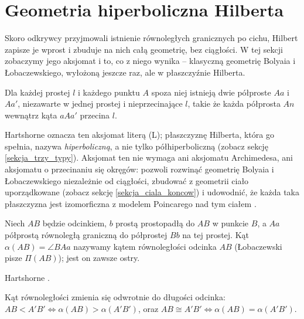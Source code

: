 \section{Geometria hiperboliczna Hilberta} %
\label{sekcja_hilbert_hiperboliczna}

Skoro odkrywcy przyjmowali istnienie równoległych granicznych po cichu, Hilbert zapisze je wprost i zbuduje na nich całą geometrię, bez ciągłości. %
W tej sekcji zobaczymy jego aksjomat i to, co z niego wynika -- klasyczną geometrię Bolyaia i Łobaczewskiego, wyłożoną jeszcze raz, ale w płaszczyźnie Hilberta. %

\begin{axiom}
	Dla każdej prostej $l$ i każdego punktu $A$ spoza niej istnieją dwie półproste $Aa$ i $Aa'$, niezawarte w jednej prostej i nieprzecinające $l$, takie że każda półprosta $An$ wewnątrz kąta $aAa'$ przecina $l$. %
\end{axiom}

Hartshorne \cite[s. 374]{hartshorne_2000} oznacza ten aksjomat literą (L); płaszczyznę Hilberta, która go spełnia, nazywa \emph{hiperboliczną}, a nie tylko półhiperboliczną (zobacz sekcję \ref{sekcja_trzy_typy}). %
Aksjomat ten nie wymaga ani aksjomatu Archimedesa, ani aksjomatu o przecinaniu się okręgów: pozwoli rozwinąć geometrię Bolyaia i Łobaczewskiego niezależnie od ciągłości, zbudować z geometrii ciało uporządkowane (zobacz sekcję \ref{sekcja_ciala_koncow}) i udowodnić, że każda taka płaszczyzna jest izomorficzna z modelem Poincarego nad tym ciałem \cite[s. 373--374]{hartshorne_2000}. %

\begin{definition}
	Niech $AB$ będzie odcinkiem, $b$ prostą prostopadłą do $AB$ w punkcie $B$, a $Aa$ półprostą równoległą graniczną do półprostej $Bb$ na tej prostej. %
	Kąt $\alpha(AB) = \angle BAa$ nazywamy kątem równoległości odcinka $AB$ (Łobaczewski pisze $\Pi(AB)$); jest on zawsze ostry. %
\end{definition}

Hartshorne \cite[s. 374--375]{hartshorne_2000}. %

\begin{proposition}
	Kąt równoległości zmienia się odwrotnie do długości odcinka: $AB < A'B' \Leftrightarrow \alpha(AB) > \alpha(A'B')$, oraz $AB \cong A'B' \Leftrightarrow \alpha(AB) = \alpha(A'B')$. %
\end{proposition}

